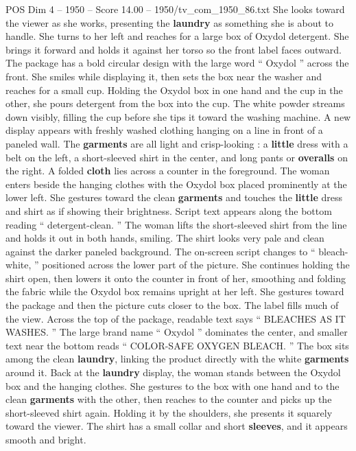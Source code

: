 \begin{textsample}{POS Dim 4 – 1950 – Score 14.00 – 1950/tv\_com\_1950\_86.txt}
She looks toward the viewer as she works, presenting the \textbf{laundry} as something she is about to handle.
She turns to her left and reaches for a large box of Oxydol detergent.
She brings it forward and holds it against her torso so the front label faces outward.
The package has a bold circular design with the large word “ Oxydol ” across the front.
She smiles while displaying it, then sets the box near the washer and reaches for a small cup.
Holding the Oxydol box in one hand and the cup in the other, she pours detergent from the box into the cup.
The white powder streams down visibly, filling the cup before she tips it toward the washing machine.
A new display appears with freshly washed clothing hanging on a line in front of a paneled wall.
The \textbf{garments} are all light and crisp-looking : a \textbf{little} dress with a belt on the left, a short-sleeved shirt in the center, and long pants or \textbf{overalls} on the right.
A folded \textbf{cloth} lies across a counter in the foreground.
The woman enters beside the hanging clothes with the Oxydol box placed prominently at the lower left.
She gestures toward the clean \textbf{garments} and touches the \textbf{little} dress and shirt as if showing their brightness.
Script text appears along the bottom reading “ detergent-clean. ” The woman lifts the short-sleeved shirt from the line and holds it out in both hands, smiling.
The shirt looks very pale and clean against the darker paneled background.
The on-screen script changes to “ bleach-white, ” positioned across the lower part of the picture.
She continues holding the shirt open, then lowers it onto the counter in front of her, smoothing and folding the fabric while the Oxydol box remains upright at her left.
She gestures toward the package and then the picture cuts closer to the box.
The label fills much of the view.
Across the top of the package, readable text says “ BLEACHES AS IT WASHES. ” The large brand name “ Oxydol ” dominates the center, and smaller text near the bottom reads “ COLOR-SAFE OXYGEN BLEACH. ” The box sits among the clean \textbf{laundry}, linking the product directly with the white \textbf{garments} around it.
Back at the \textbf{laundry} display, the woman stands between the Oxydol box and the hanging clothes.
She gestures to the box with one hand and to the clean \textbf{garments} with the other, then reaches to the counter and picks up the short-sleeved shirt again.
Holding it by the shoulders, she presents it squarely toward the viewer.
The shirt has a small collar and short \textbf{sleeves}, and it appears smooth and bright.

\end{textsample}
